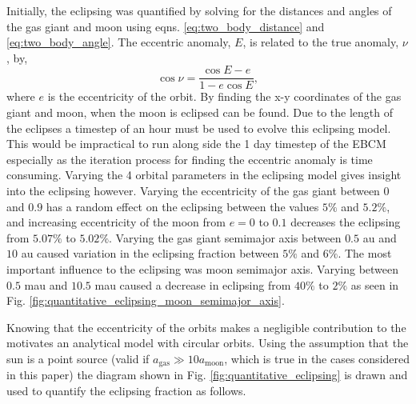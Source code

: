 \documentclass[12pt, onecolumn]{revtex4-2}    %
\begin{document}
Initially, the eclipsing was quantified by solving for the distances and angles of the gas giant and moon using eqns. \eqref{eq:two_body_distance} and \eqref{eq:two_body_angle}.
The eccentric anomaly, $E$, is related to the true anomaly, $\nu$, by,
\begin{equation}
  \cos \nu =  \frac{\cos E - e}{1 - e \cos E},
  \label{eq:true_anomaly}
\end{equation}
where $e$ is the eccentricity of the orbit.
By finding the x-y coordinates of the gas giant and moon, when the moon is eclipsed can be found.
Due to the length of the eclipses a timestep of an hour must be used to evolve this eclipsing model.
This would be impractical to run along side the 1 day timestep of the EBCM especially as the iteration process for finding the eccentric anomaly is time consuming.
Varying the 4 orbital parameters in the eclipsing model gives insight into the eclipsing however.
Varying the eccentricity of the gas giant between $0$ and $0.9$ has a random effect on the eclipsing between the values $5\%$ and $5.2\%$, and increasing eccentricity of the moon from $e=0$ to $0.1$ decreases the eclipsing from $5.07\%$ to $5.02\%$.
Varying the gas giant semimajor axis between $0.5$ au and $10$ au caused variation in the eclipsing fraction between $5\%$ and $6\%$. 
The most important influence to the eclipsing was moon semimajor axis.
Varying between $0.5$ mau and $10.5$ mau caused a decrease in eclipsing from $40\%$ to $2\%$ as seen in Fig. \ref{fig:quantitative_eclipsing_moon_semimajor_axis}.

Knowing that the eccentricity of the orbits makes a negligible contribution to the motivates an analytical model with circular orbits.
Using the assumption that the sun is a point source (valid if $a_\text{gas} \gg 10a_\text{moon}$, which is true in the cases considered in this paper) the diagram shown in Fig. \ref{fig:quantitative_eclipsing} is drawn and used to quantify the eclipsing fraction as follows.
\end{document}
